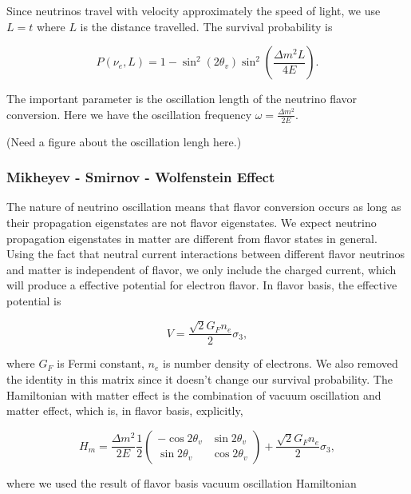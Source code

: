Since neutrinos travel with velocity approximately the speed of light, we use $L = t$ where $L$ is the distance travelled. The survival probability is

\begin{equation}
P(\nu_e,L) =  1-\sin^2(2\theta_v)\sin^2\left( \frac{\Delta m^2 L}{4E} \right).
\end{equation}


The important parameter is the oscillation length of the neutrino flavor conversion. Here we have the oscillation frequency $\omega = \frac{\Delta m^2}{2E}$.

(Need a figure about the oscillation lengh here.)



\subsubsection{Mikheyev - Smirnov - Wolfenstein Effect}

The nature of neutrino oscillation means that flavor conversion occurs as long as their propagation eigenstates are not flavor eigenstates. We expect neutrino propagation eigenstates in matter are different from flavor states in general.\cite{wolf78} Using the fact that neutral current interactions between different flavor neutrinos and matter is independent of flavor, we only include the charged current, which will produce a effective potential for electron flavor. In flavor basis, the effective potential is

\begin{equation}
V=\frac{\sqrt{2}G_F n_e}{2} \sigma_3,
\end{equation}

where $G_F$ is Fermi constant, $n_e$ is number density of electrons. We also removed the identity in this matrix since it doesn't change our survival probability. The Hamiltonian with matter effect is the combination of vacuum oscillation and matter effect, which is, in flavor basis, explicitly,

\begin{equation}
H_m = \frac{ \Delta m^2 }{2E}\frac{1}{2}\begin{pmatrix} -\cos 2\theta_v & \sin 2 \theta_v \\ \sin 2\theta_v & \cos 2\theta_v  \end{pmatrix} + \frac{\sqrt{2}G_F n_e}{2} \sigma_3,
\end{equation}

where we used the result of flavor basis vacuum oscillation Hamiltonian

